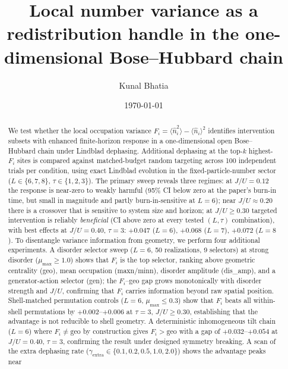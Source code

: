 \documentclass[aps,prresearch,reprint,amsmath,amssymb,longbibliography,floatfix]{revtex4-2}
\newcommand{\Fi}{F_i}
\newcommand{\nop}{\hat{n}}
\begin{document}
\title{Local number variance as a redistribution handle in the one-dimensional Bose--Hubbard chain}

\author{Kunal Bhatia}

\date{\today}

\begin{abstract}
We test whether the local occupation variance
$\Fi = \langle\nop_i^2\rangle - \langle\nop_i\rangle^2$ identifies
intervention subsets with enhanced finite-horizon response in a
one-dimensional open Bose--Hubbard chain under Lindblad dephasing.
Additional dephasing at the top-$k$ highest-$\Fi$ sites is compared
against matched-budget random targeting across 100 independent trials
per condition, using exact Lindblad evolution in the fixed-particle-number
sector ($L\in\{6,7,8\}$, $\tau\in\{1,2,3\}$).
The primary sweep reveals three regimes: at $J/U=0.12$ the response is
near-zero to weakly harmful (95\% CI below zero at the paper's burn-in
time, but small in magnitude and partly burn-in-sensitive at $L=6$);
near $J/U\approx0.20$ there is a crossover that is sensitive to system size
and horizon; at $J/U\geq0.30$ targeted intervention is reliably
\emph{beneficial} (CI above zero at every tested $(L,\tau)$ combination),
with best effects at $J/U=0.40$, $\tau=3$: $+0.047$ ($L=6$), $+0.068$
($L=7$), $+0.072$ ($L=8$).
To disentangle variance information from geometry, we perform four
additional experiments.
A disorder selector sweep ($L=6$, 50 realizations, 9 selectors) at strong
disorder ($\mu_{\max}\geq1.0$) shows that $\Fi$ is the top selector,
ranking above geometric centrality (geo), mean occupation (maxn/minn),
disorder amplitude (dis\_amp), and a generator-action selector (gen); the
$\Fi$--geo gap grows monotonically with disorder strength and $J/U$,
confirming that $\Fi$ carries information beyond raw spatial position.
Shell-matched permutation controls ($L=6$, $\mu_{\max}\leq0.3$) show that
$\Fi$ beats all within-shell permutations by $+0.002$--$+0.006$ at
$\tau=3$, $J/U\geq0.30$, establishing that the advantage is not reducible
to shell geometry.
A deterministic inhomogeneous tilt chain ($L=6$) where $\Fi\neq\mathrm{geo}$
by construction gives $\Fi>\mathrm{geo}$ with a gap of $+0.032$--$+0.054$
at $J/U=0.40$, $\tau=3$, confirming the result under designed symmetry
breaking.
A scan of the extra dephasing rate ($\gamma_{\mathrm{extra}}\in
\{0.1,0.2,0.5,1.0,2.0\}$) shows the advantage peaks near

\end{abstract}
\end{document}
